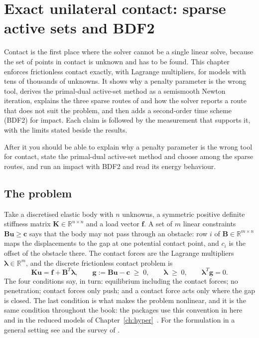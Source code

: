 \chapter{Exact unilateral contact: sparse active sets and BDF2}\label{ch:contact}

\begin{tcolorbox}[colback=gray!5,colframe=gray!50,title={In this chapter}]
Contact is the first place where the solver cannot be a single linear solve, because the set of points in contact is unknown and has to be found. This chapter enforces frictionless contact exactly, with Lagrange multipliers, for models with tens of thousands of unknowns. It shows why a penalty parameter is the wrong tool, derives the primal-dual active-set method as a semismooth Newton iteration, explains the three sparse routes of  and how the solver reports a route that does not suit the problem, and then adds a second-order time scheme (BDF2) for impact. Each claim is followed by the measurement that supports it, with the limits stated beside the results.\par\smallskip
After it you should be able to explain why a penalty parameter is the wrong tool for contact, state the primal-dual active-set method and choose among the sparse routes, and run an impact with BDF2 and read its energy behaviour.
\end{tcolorbox}

\section{The problem}\label{sec:ct-problem}

Take a discretised elastic body with $n$ unknowns, a symmetric positive definite stiffness matrix $\bm K\in\mathbb R^{n\times n}$ and a load vector $\bm f$. A set of $m$ linear constraints $\bm B\bm u\ge\bm c$ says that the body may not pass through an obstacle: row $i$ of $\bm B\in\mathbb R^{m\times n}$ maps the displacements to the gap at one potential contact point, and $c_i$ is the offset of the obstacle there. The contact forces are the Lagrange multipliers $\bm\lambda\in\mathbb R^m$, and the discrete frictionless contact problem is
\begin{equation}\label{eq:ct-kkt}
\bm K\bm u=\bm f+\bm B^{T}\bm\lambda,\qquad
\bm g:=\bm B\bm u-\bm c\;\ge\;0,\qquad
\bm\lambda\;\ge\;0,\qquad
\bm\lambda^{T}\bm g=0 .
\end{equation}
The four conditions say, in turn: equilibrium including the contact forces; no penetration; contact forces only push; and a contact force acts only where the gap is closed. The last condition is what makes the problem nonlinear, and it is the same condition throughout the book: the packages use this convention in \fea{} here and in the reduced models of Chapter~\ref{ch:hyper}~\cite{balajewicz2016contact}. For the formulation in a general setting see \citet{wriggers2006contact} and the survey of \citet{wohlmuth2011contact}.

